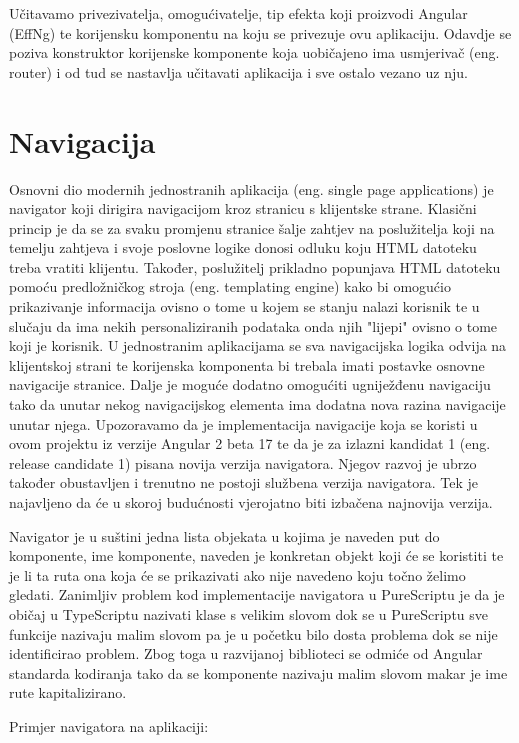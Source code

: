 \documentclass[times, utf8, zavrsni]{fer}
\begin{document}
Učitavamo privezivatelja, omogućivatelje, tip efekta koji proizvodi Angular (EffNg) te korijensku komponentu na koju se privezuje ovu aplikaciju. Odavdje se poziva konstruktor korijenske komponente koja uobičajeno ima usmjerivač (eng. router) i od tud se nastavlja učitavati aplikacija i sve ostalo vezano uz nju.

\section{Navigacija}
Osnovni dio modernih jednostranih aplikacija (eng. single page applications) je navigator koji dirigira navigacijom kroz stranicu s klijentske strane. Klasični princip je da se za svaku promjenu stranice šalje zahtjev na poslužitelja koji na temelju zahtjeva i svoje poslovne logike donosi odluku koju HTML datoteku treba vratiti klijentu. Također, poslužitelj prikladno popunjava HTML datoteku pomoću predložničkog stroja (eng. templating engine) kako bi omogućio prikazivanje informacija ovisno o tome u kojem se stanju nalazi korisnik te u slučaju da ima nekih personaliziranih podataka onda njih "lijepi" ovisno o tome koji je korisnik. U jednostranim aplikacijama se sva navigacijska logika odvija na klijentskoj strani te korijenska komponenta bi trebala imati postavke osnovne navigacije stranice. Dalje je moguće dodatno omogućiti ugniježđenu navigaciju tako da unutar nekog navigacijskog elementa ima dodatna nova razina navigacije unutar njega. Upozoravamo da je implementacija navigacije koja se koristi u ovom projektu iz verzije Angular 2 beta 17 te da je za izlazni kandidat 1 (eng. release candidate 1) pisana novija verzija navigatora. Njegov razvoj je ubrzo također obustavljen i trenutno ne postoji službena verzija navigatora. Tek je najavljeno da će u skoroj budućnosti vjerojatno biti izbačena najnovija verzija.

Navigator je u suštini jedna lista objekata u kojima je naveden put do komponente, ime komponente, naveden je konkretan objekt koji će se koristiti te je li ta ruta ona koja će se prikazivati ako nije navedeno koju točno želimo gledati. Zanimljiv problem kod implementacije navigatora u PureScriptu je da je običaj u TypeScriptu nazivati klase s velikim slovom dok se u PureScriptu sve funkcije nazivaju malim slovom pa je u početku bilo dosta problema dok se nije identificirao problem. Zbog toga u razvijanoj biblioteci se odmiće od Angular standarda kodiranja tako da se komponente nazivaju malim slovom makar je ime rute kapitalizirano.

Primjer navigatora na aplikaciji:
\end{document}
